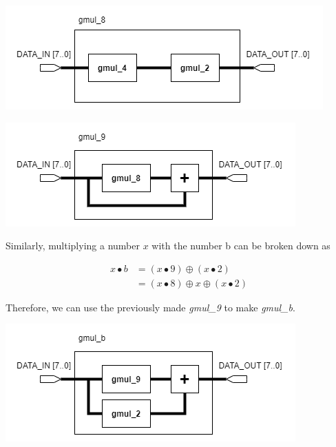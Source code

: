 \documentclass[a4paper, 10pt]{article}
\newenvironment{Figure}
    {\par\medskip\noindent\minipage{\linewidth}}
    {\endminipage\par\medskip}
\begin{document}
\begin{multicols}{2}
	\noindent
            \begin{Figure}
                \centering
                \includegraphics[width=\linewidth]{InvMixColumns-gmul_8.png}
                \label{fig:gmul-8}
            \end{Figure}

	\noindent
            \begin{Figure}
                \centering
                \includegraphics[width=\linewidth]{InvMixColumns-gmul_9.png}
                \label{fig:gmul-9}
            \end{Figure}

	Similarly, multiplying a number $x$ with the number b can be broken down as

\begin{equation}
\begin{aligned}
	x \bullet b & = (x \bullet 9) \oplus (x \bullet 2) \\
	& = (x \bullet 8) \oplus x \oplus (x \bullet 2)
\end{aligned}
\end{equation}

	Therefore, we can use the previously made \textit{gmul\_9} to make \textit{gmul\_b}.

	\noindent
            \begin{Figure}
                \centering
                \includegraphics[width=\linewidth]{InvMixColumns-gmul_b.png}
                \label{fig:gmul-b}
            \end{Figure}


\end{multicols}
\end{document}
